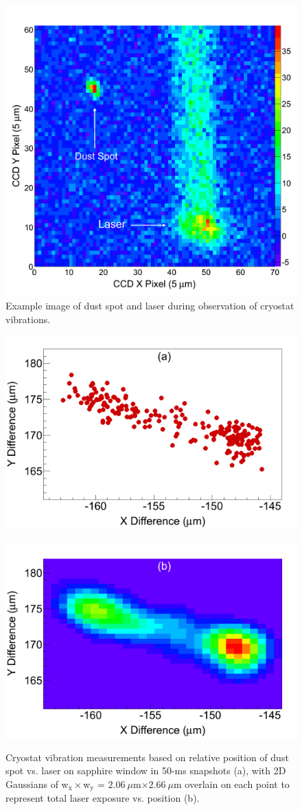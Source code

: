 
\begin{figure} %
        \centering
                \includegraphics[width=.6\textwidth]{figures/image_dustspot.png}
                \caption{Example image of dust spot and laser during observation of cryostat vibrations.}
\label{fig:dustspot}
\end{figure}

\begin{figure} %
        \centering
                \includegraphics[width=.5\textwidth]{figures/cryovibes_a.png}
                ~
                \includegraphics[width=.5\textwidth]{figures/cryovibes_b.png}
                \caption{Cryostat vibration measurements based on relative position of dust spot vs. laser on sapphire window in 50-ms snapshots (a), with 2D Gaussians of w$_{\text{x}} \times $w$_{\text{y}}$ = $2.06~\mu$m$ \times 2.66~\mu$m overlain on each point to represent total laser exposure vs. position (b).}
\label{fig:cryovibe2D}
\end{figure}

